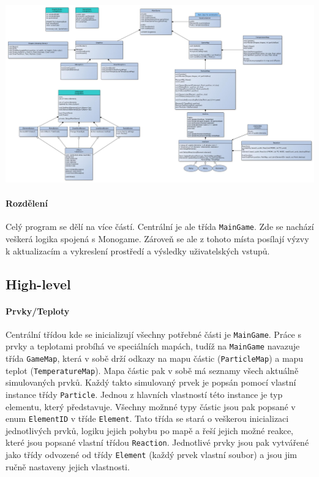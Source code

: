 \documentclass[a4paper, 12pt]{article}
\begin{document}
\begin{center}
    \hspace*{-80px}
    \includegraphics[width=1.4\linewidth]{GrainSim.jpg}
\end{center}

\paragraph{Rozdělení}
Celý program se dělí na více částí. Centrální je ale třída \texttt{MainGame}.
Zde se nachází veškerá logika spojená s Monogame. Zároveň se ale z tohoto
místa posílají výzvy k aktualizacím a vykreslení prostředí a výsledky
uživatelských vstupů. 

\newpage
\subsection{High-level}
\paragraph{Prvky/Teploty}
Centrální třídou kde se inicializují všechny potřebné části je
\texttt{MainGame}. Práce s prvky a teplotami probíhá ve speciálních mapách,
tudíž na \texttt{MainGame} navazuje třída \texttt{GameMap}, která v sobě drží
odkazy na mapu částic (\texttt{ParticleMap}) a mapu teplot
(\texttt{TemperatureMap}). Mapa částic pak v sobě má seznamy všech aktuálně
simulovaných prvků. Každý takto simulovaný prvek je popsán pomocí vlastní
instance třídy \texttt{Particle}. Jednou z hlavních vlastností této instance je
typ elementu, který představuje. Všechny možnné typy částic jsou pak popsané v
enum \texttt{ElementID} v tříde \texttt{Element}. Tato třída se stará o
veškerou inicializaci jednotlivých prvků, logiku jejich pohybu po mapě a řeší
jejich možné reakce, které jsou popsané vlastní třídou \texttt{Reaction}.
Jednotlivé prvky jsou pak vytvářené jako třídy odvozené od třídy
\texttt{Element} (každý prvek vlastní soubor) a jsou jim ručně nastaveny jejich
vlastnosti.
\end{document}
